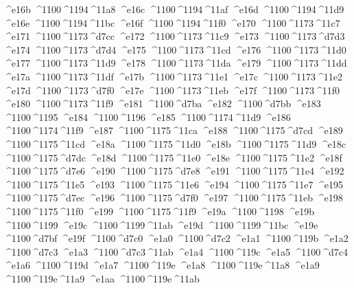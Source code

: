 \checkit ^^^^e16b ^^^^1100^^^^1194^^^^11a8
\checkit ^^^^e16c ^^^^1100^^^^1194^^^^11af
\checkit ^^^^e16d ^^^^1100^^^^1194^^^^11d9
\checkit ^^^^e16e ^^^^1100^^^^1194^^^^11bc
\checkit ^^^^e16f ^^^^1100^^^^1194^^^^11f0
\checkit ^^^^e170 ^^^^1100^^^^1173^^^^11c7
\checkit ^^^^e171 ^^^^1100^^^^1173^^^^d7cc
\checkit ^^^^e172 ^^^^1100^^^^1173^^^^11c9
\checkit ^^^^e173 ^^^^1100^^^^1173^^^^d7d3
\checkit ^^^^e174 ^^^^1100^^^^1173^^^^d7d4
\checkit ^^^^e175 ^^^^1100^^^^1173^^^^11cd
\checkit ^^^^e176 ^^^^1100^^^^1173^^^^11d0
\checkit ^^^^e177 ^^^^1100^^^^1173^^^^11d9
\checkit ^^^^e178 ^^^^1100^^^^1173^^^^11da
\checkit ^^^^e179 ^^^^1100^^^^1173^^^^11dd
\checkit ^^^^e17a ^^^^1100^^^^1173^^^^11df
\checkit ^^^^e17b ^^^^1100^^^^1173^^^^11e1
\checkit ^^^^e17c ^^^^1100^^^^1173^^^^11e2
\checkit ^^^^e17d ^^^^1100^^^^1173^^^^d7f0
\checkit ^^^^e17e ^^^^1100^^^^1173^^^^11eb
\checkit ^^^^e17f ^^^^1100^^^^1173^^^^11f0
\checkit ^^^^e180 ^^^^1100^^^^1173^^^^11f9
\checkit ^^^^e181 ^^^^1100^^^^d7ba
\checkit ^^^^e182 ^^^^1100^^^^d7bb
\checkit ^^^^e183 ^^^^1100^^^^1195
\checkit ^^^^e184 ^^^^1100^^^^1196
\checkit ^^^^e185 ^^^^1100^^^^1174^^^^11d9
\checkit ^^^^e186 ^^^^1100^^^^1174^^^^11f9
\checkit ^^^^e187 ^^^^1100^^^^1175^^^^11ca
\checkit ^^^^e188 ^^^^1100^^^^1175^^^^d7cd
\checkit ^^^^e189 ^^^^1100^^^^1175^^^^11cd
\checkit ^^^^e18a ^^^^1100^^^^1175^^^^11d0
\checkit ^^^^e18b ^^^^1100^^^^1175^^^^11d9
\checkit ^^^^e18c ^^^^1100^^^^1175^^^^d7dc
\checkit ^^^^e18d ^^^^1100^^^^1175^^^^11e0
\checkit ^^^^e18e ^^^^1100^^^^1175^^^^11e2
\checkit ^^^^e18f ^^^^1100^^^^1175^^^^d7e6
\checkit ^^^^e190 ^^^^1100^^^^1175^^^^d7e8
\checkit ^^^^e191 ^^^^1100^^^^1175^^^^11e4
\checkit ^^^^e192 ^^^^1100^^^^1175^^^^11e5
\checkit ^^^^e193 ^^^^1100^^^^1175^^^^11e6
\checkit ^^^^e194 ^^^^1100^^^^1175^^^^11e7
\checkit ^^^^e195 ^^^^1100^^^^1175^^^^d7ec
\checkit ^^^^e196 ^^^^1100^^^^1175^^^^d7f0
\checkit ^^^^e197 ^^^^1100^^^^1175^^^^11eb
\checkit ^^^^e198 ^^^^1100^^^^1175^^^^11f0
\checkit ^^^^e199 ^^^^1100^^^^1175^^^^11f9
\checkit ^^^^e19a ^^^^1100^^^^1198
\checkit ^^^^e19b ^^^^1100^^^^1199
\checkit ^^^^e19c ^^^^1100^^^^1199^^^^11ab
\checkit ^^^^e19d ^^^^1100^^^^1199^^^^11bc
\checkit ^^^^e19e ^^^^1100^^^^d7bf
\checkit ^^^^e19f ^^^^1100^^^^d7c0
\checkit ^^^^e1a0 ^^^^1100^^^^d7c2
\checkit ^^^^e1a1 ^^^^1100^^^^119b
\checkit ^^^^e1a2 ^^^^1100^^^^d7c3
\checkit ^^^^e1a3 ^^^^1100^^^^d7c3^^^^11ab
\checkit ^^^^e1a4 ^^^^1100^^^^119c
\checkit ^^^^e1a5 ^^^^1100^^^^d7c4
\checkit ^^^^e1a6 ^^^^1100^^^^119d
\checkit ^^^^e1a7 ^^^^1100^^^^119e
\checkit ^^^^e1a8 ^^^^1100^^^^119e^^^^11a8
\checkit ^^^^e1a9 ^^^^1100^^^^119e^^^^11a9
\checkit ^^^^e1aa ^^^^1100^^^^119e^^^^11ab
